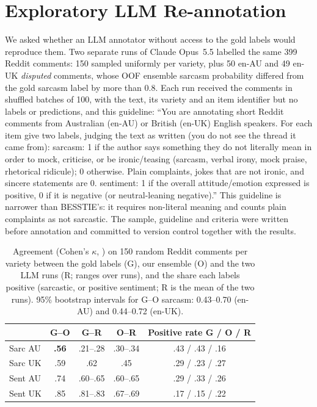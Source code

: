 \documentclass[11pt]{article}
\begin{document}
\section{Exploratory LLM Re-annotation}
\label{app:readers}
We asked whether an LLM annotator without access to the gold labels would reproduce them. Two separate runs of Claude
Opus~5.5 labelled the same 399 Reddit comments: 150 sampled uniformly per variety, plus 50 en-AU and 49 en-UK \emph{disputed}
comments, whose OOF ensemble sarcasm probability differed from the gold sarcasm label by more than 0.8. Each run received the comments in
shuffled batches of 100, with the text, its variety and an item identifier but no labels or predictions, and this
guideline: ``You are annotating short Reddit comments from Australian (en-AU) or British (en-UK) English speakers. For
each item give two labels, judging the text as written (you do not see the thread it came from): sarcasm: 1 if the author
says something they do not literally mean in order to mock, criticise, or be ironic/teasing (sarcasm, verbal irony, mock
praise, rhetorical ridicule); 0 otherwise. Plain complaints, jokes that are not ironic, and sincere statements are 0.
sentiment: 1 if the overall attitude/emotion expressed is positive, 0 if it is negative (or neutral-leaning negative).''
This guideline is narrower than BESSTIE's: it requires non-literal meaning and counts plain complaints as not
sarcastic. The sample, guideline and criteria were written before annotation and committed to version control together with the
results.

\begin{table}[!ht]
\centering\small
\setlength{\tabcolsep}{3pt}
\begin{tabular}{lcccc}
\toprule
 & G--O & G--R & O--R & Positive rate G / O / R \\
\midrule
Sarc AU & \textbf{.56} & .21--.28 & .30--.34 & .43 / .43 / .16 \\
Sarc UK & .59 & .62 & .45 & .29 / .23 / .27 \\
Sent AU & .74 & .60--.65 & .60--.65 & .29 / .33 / .26 \\
Sent UK & .85 & .81--.83 & .67--.69 & .17 / .15 / .22 \\
\bottomrule
\end{tabular}
\caption{Agreement (Cohen's $\kappa$, \citealp{cohen1960kappa}) on 150 random Reddit comments per variety between the gold
labels (G), our ensemble (O) and the two LLM runs (R; ranges over runs), and the share each labels positive (sarcastic,
or positive sentiment; R is the mean of the two runs). 95\% bootstrap intervals for G--O sarcasm: 0.43--0.70 (en-AU)
and 0.44--0.72 (en-UK).}
\label{tab:reannot}
\end{table}
\end{document}
